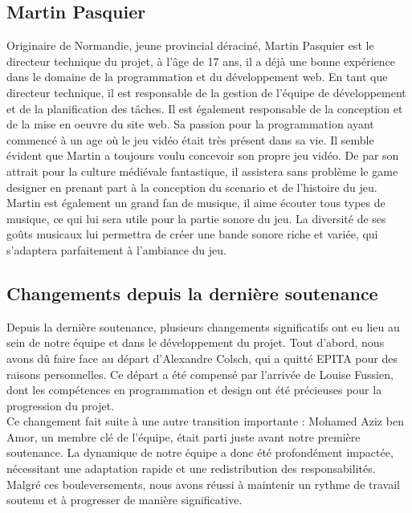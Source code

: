 \subsection*{Martin Pasquier}
Originaire de Normandie, jeune provincial déraciné, Martin Pasquier est le directeur technique du projet, à l'âge de 17 ans, il a déjà une
bonne expérience dans le domaine de la programmation et du développement web. En tant
que directeur technique, il est responsable de la gestion de l'équipe de développement et de la
planification des tâches. Il est également responsable de la conception et de la mise en oeuvre
du site web.
Sa passion pour la programmation ayant commencé à un age où le jeu vidéo était très
présent dans sa vie. Il semble évident que Martin a toujours voulu concevoir son propre jeu
vidéo. De par son attrait pour la culture médiévale fantastique, il assistera sans problème le
game designer en prenant part à la conception du scenario et de l'histoire du jeu.
Martin est également un grand fan de musique, il aime écouter tous types de musique, ce
qui lui sera utile pour la partie sonore du jeu. La diversité de ses goûts musicaux lui permettra
de créer une bande sonore riche et variée, qui s'adaptera parfaitement à l'ambiance du jeu.


\subsection{Changements depuis la dernière soutenance}


Depuis la dernière soutenance, plusieurs changements significatifs ont eu lieu au sein de notre équipe et dans le développement du projet.
Tout d'abord, nous avons dû faire face au départ d'Alexandre Colsch, qui a quitté EPITA  pour des raisons personnelles.
Ce départ a été compensé par l'arrivée de Louise Fussien, dont les compétences en programmation et design ont été précieuses pour la progression du projet.
\\

Ce changement fait suite à une autre transition importante : Mohamed Aziz ben Amor, un membre clé de l'équipe, était parti juste avant notre première soutenance.
La dynamique de notre équipe a donc été profondément impactée, nécessitant une adaptation rapide et une redistribution des responsabilités.
\\

Malgré ces bouleversements, nous avons réussi à maintenir un rythme de travail soutenu et à progresser de manière significative.
\\

